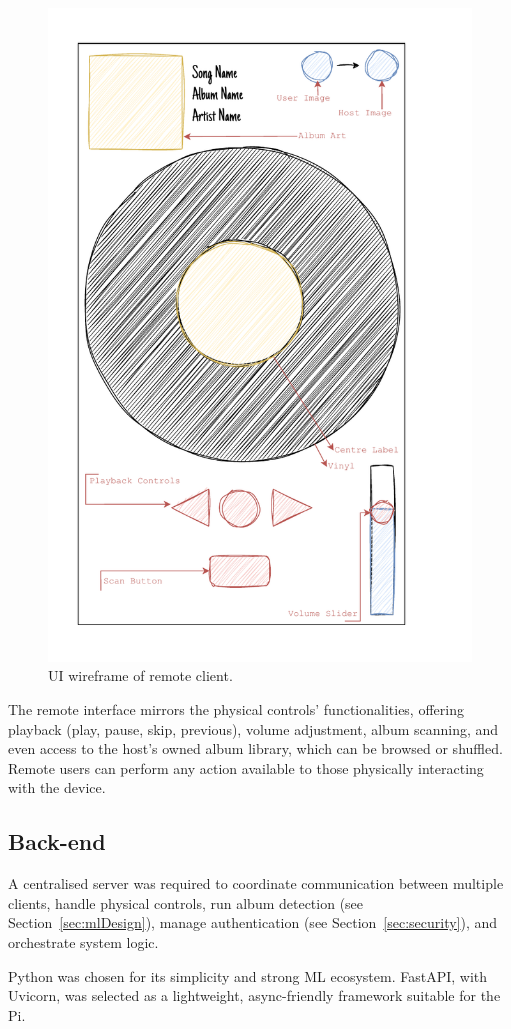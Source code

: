                 \begin{figure}[h]
                    \centering
                    \includegraphics[width=0.55\linewidth]{images/SketchRemote.pdf}
                    \caption{UI wireframe of remote client.}
                    \label{fig:sketchRemote}
                \end{figure}
                
                The remote interface mirrors the physical controls' functionalities, offering playback (play, pause, skip, previous), volume adjustment, album scanning, and even access to the host's owned album library, which can be browsed or shuffled. Remote users can perform any action available to those physically interacting with the device.
    
        
        \subsection{Back-end}
    
            A centralised server was required to coordinate communication between multiple clients, handle physical controls, run album detection (see Section~\ref{sec:mlDesign}), manage authentication (see Section~\ref{sec:security}), and orchestrate system logic.
    
            Python was chosen for its simplicity and strong ML ecosystem. FastAPI, with Uvicorn, was selected as a lightweight, async-friendly framework suitable for the Pi.
    
